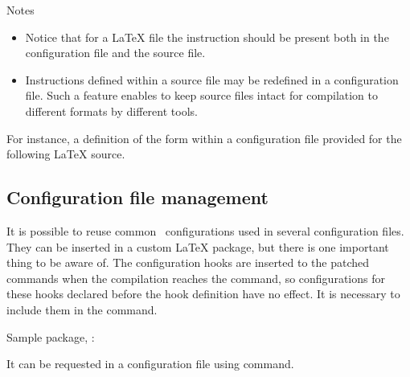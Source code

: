 Notes

\begin{itemize}
  \item Notice that for a LaTeX file the \texcommand{}
    instruction should be present both in the configuration file and the source
    file.

  \item Instructions defined within a source file may be redefined in a
    configuration file. Such a feature enables to keep source files intact for
    compilation to different formats by different tools.
\end{itemize}

For instance, a definition of the form  within a
configuration file provided for the following LaTeX source.


\subsection{Configuration file management}

It is possible to reuse common \texfourht\ configurations used in several
configuration files.  They can be inserted in a custom LaTeX package, but there
is one important thing to be aware of. The configuration hooks are inserted to
the patched commands when the compilation reaches the  
\texcommand{} command, so configurations for these hooks
declared before the hook definition have no effect. It is necessary to include
them in the \texcommand{\AtBeginDocument} command.

Sample package, :


It can be requested in a configuration file using \texcommand{\RequirePackage} command.

\begin{texsource}
\RequirePackage{commonconfigurations}

\EndPreamble
\end{texsource}


